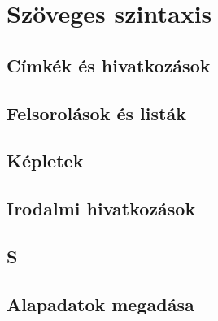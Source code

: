 \chapter{Szöveges szintaxis}


\section{Címkék és hivatkozások}





\section{Felsorolások és listák}


\section{Képletek}

\section{Irodalmi hivatkozások}


\section{S}


\section{Alapadatok megadása}






